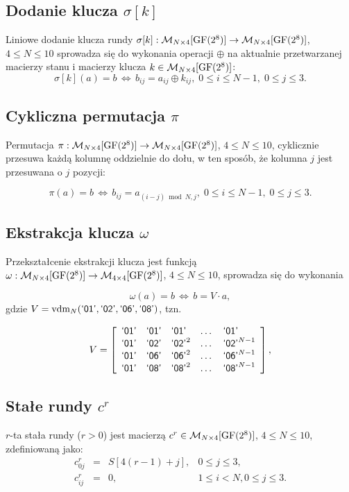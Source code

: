 \subsection{Dodanie klucza $\sigma[k]$}

Liniowe dodanie klucza rundy $\sigma[k]: \mathcal{M}_{N \times 4}[\mathrm{GF}(2^8)] \rightarrow
\mathcal{M}_{N \times 4}[\mathrm{GF}(2^8)]$, $4 \leqslant N \leqslant 10$ sprowadza się do wykonania operacji $\oplus$ na aktualnie przetwarzanej macierzy stanu i macierzy klucza $k \in \mathcal{M}_{N \times 4}[\mathrm{GF}(2^8)]$:
\[
\sigma[k](a) = b \,\Leftrightarrow\, b_{ij} = a_{ij} \oplus
k_{ij}, \; 0 \leqslant i \leqslant N-1, \; 0 \leqslant j
\leqslant 3.
\]

\subsection{Cykliczna permutacja $\pi$}

Permutacja  $\pi: \mathcal{M}_{N \times 4}[\mathrm{GF}(2^8)] \rightarrow \mathcal{M}_{N \times 4}[\mathrm{GF}(2^8)]$,
$4 \leqslant N \leqslant 10$, cyklicznie przesuwa każdą kolumnę oddzielnie do dołu, w ten sposób, że kolumna $j$ jest przesuwana o $j$ pozycji:

\[
\pi(a) = b \,\Leftrightarrow\, b_{ij} = a_{(i-j) \bmod N, j}, \;
0 \leqslant i \leqslant N-1, \; 0 \leqslant j \leqslant 3.
\]

\subsection{Ekstrakcja klucza $\omega$}

Przekształcenie ekstrakcji klucza jest funkcją $\omega: \mathcal{M}_{N \times 4}[\mathrm{GF}(2^8)] \rightarrow
\mathcal{M}_{4 \times 4}[\mathrm{GF}(2^8)]$, $4 \leqslant N \leqslant 10$, sprowadza się do wykonania

\[
\omega(a) = b \,\Leftrightarrow\, b = V \cdot a,
\]
gdzie $V = \mathrm{vdm}_N(\textsf{`01'}, \textsf{`02'},\textsf{`06'},\textsf{`08'})$, tzn.

\[
V = \left[\begin{array}{lllcl} %
\gf{01} & \gf{01} & \gf{01}^{} & \dots & \gf{01}^{}\\
\gf{01} & \gf{02} & \gf{02}^2 & \dots & \gf{02}^{N-1}\\
\gf{01} & \gf{06} & \gf{06}^2 & \dots & \gf{06}^{N-1}\\
\gf{01} & \gf{08} & \gf{08}^2 & \dots & \gf{08}^{N-1}
\end{array}\right],
\]

\subsection{Stałe rundy $c^r$}
$r$-ta stała rundy ($r > 0$) jest macierzą $c^r \in
\mathcal{M}_{N \times 4}[\mathrm{GF}(2^8)]$, $4 \leqslant N \leqslant 10$, zdefiniowaną jako:
\[
\begin{array}{lcll}
c_{0j}^r & = & S[4(r - 1) + j], & 0 \leqslant j \leqslant 3,\\
c_{ij}^r & = & 0, & 1 \leqslant i < N, 0 \leqslant j \leqslant 3.
\end{array}
\]

